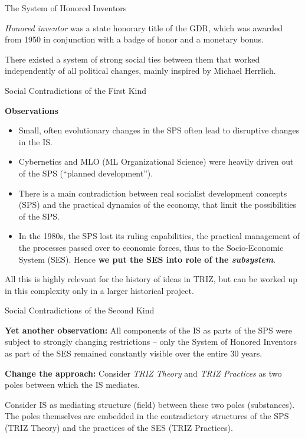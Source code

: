 \documentclass[11pt]{beamer}
\begin{document}
\begin{frame}{The System of Honored Inventors}
  
  \emph{Honored inventor} was a state honorary title of the GDR, which
  was awarded from 1950 in conjunction with a badge of honor and a monetary
  bonus.

  There existed a system of strong social ties between them that worked
  independently of all political changes, mainly inspired by Michael Herrlich.

\end{frame}

\begin{frame}{Social Contradictions of the First Kind}

\textbf{Observations}\small
\begin{itemize}
\item Small, often evolutionary changes in the SPS often lead to disruptive
  changes in the IS.
\item Cybernetics and MLO (ML Organizational Science) were heavily driven out
  of the SPS (``planned development'').
\item There is a main contradiction between real socialist development
  concepts (SPS) and the practical dynamics of the economy, that limit the
  possibilities of the SPS.
\item In the 1980s, the SPS lost its ruling capabilities, the practical
  management of the processes passed over to economic forces, thus to the
  Socio-Economic System (SES). Hence \textbf{we put the SES into role of the
  \emph{subsystem}}.
\end{itemize}
All this is highly relevant for the history of ideas in TRIZ, but can be
worked up in this complexity only in a larger historical project.

\end{frame}

\begin{frame}{Social Contradictions of the Second Kind}

\textbf{Yet another observation:} All components of the IS as parts of the SPS
were subject to strongly changing restrictions -- only the System of Honored
Inventors as part of the SES remained constantly visible over the entire 30
years.

\textbf{Change the approach:} Consider \emph{TRIZ Theory} and \emph{TRIZ
  Practices} as two poles between which the IS mediates.

Consider IS as mediating structure (field) between these two poles
(substances).  The poles themselves are embedded in the contradictory
structures of the SPS (TRIZ Theory) and the practices of the SES (TRIZ
Practices).
\end{frame}
\end{document}
